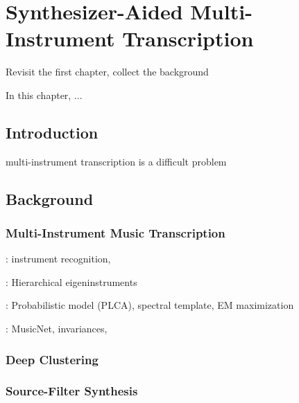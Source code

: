 
\graphicspath{{7-timbre/figures/}}

\chapter{Synthesizer-Aided Multi-Instrument Transcription}
\label{ch:timbre}

Revisit the first chapter, collect the background 

In this chapter, ...

\section{Introduction}

multi-instrument transcription is a difficult problem

\section{Background}


\subsection{Multi-Instrument Music Transcription}

\cite{itoyama2011bayesian}: instrument recognition, 

\cite{grindlay2009eigeninstruments}: Hierarchical eigeninstruments

\cite{benetos2015probabilistic}: Probabilistic model (PLCA), spectral template, EM maximization

\cite{thickstun2017musicnet}: MusicNet, \cite{thickstun2018invariances} invariances,

\subsection{Deep Clustering}

\cite{hershey2016deepclustering}

\subsection{Source-Filter Synthesis}

\cite{heittola2009separation}

